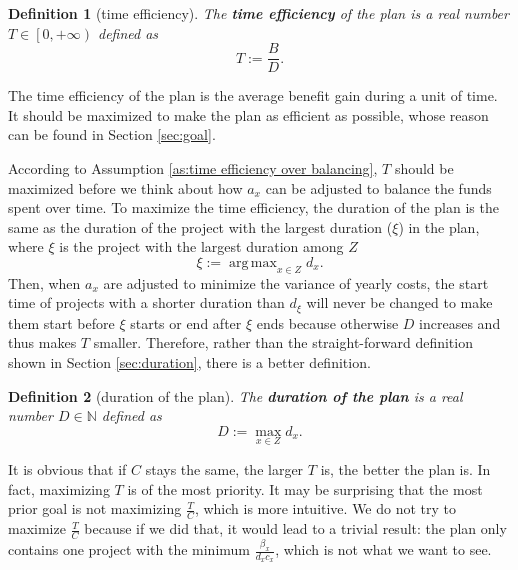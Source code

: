 \documentclass{article}
\DeclareMathOperator*{\argmax}{arg\,max}
\newtheorem{definition}{Definition}
\begin{document}
\begin{definition}[time efficiency]
The \textbf{time efficiency} of the plan is a real number $T\in\left[0,+\infty\right)$ defined as
\begin{equation}
T:=\frac BD.
\end{equation}
\end{definition}

The time efficiency of the plan is the average benefit gain during a unit of time.
It should be maximized to make the plan as efficient as possible,
whose reason can be found in Section \ref{sec:goal}.

According to Assumption \ref{as:time efficiency over balancing}, $T$ should be maximized before we think about how $a_x$ can be adjusted to balance the funds spent over time.
To maximize the time efficiency, the duration of the plan is the same as the duration of the project with the largest duration ($\xi$) in the plan,
where $\xi$ is the project with the largest duration among $Z$
\begin{equation}
\xi:=\argmax_{x\in Z}d_x.
\end{equation}
Then, when $a_x$ are adjusted to minimize the variance of yearly costs,
the start time of projects with a shorter duration than $d_\xi$ will never be changed to make them start before $\xi$ starts or end after $\xi$ ends
because otherwise $D$ increases and thus makes $T$ smaller.
Therefore, rather than the straight-forward definition shown in Section \ref{sec:duration}, there is a better definition.

\begin{definition}[duration of the plan]
The \textbf{duration of the plan} is a real number $D\in\mathbb N$ defined as
\begin{equation}
\label{eq:duration of the plan}
D:=\max_{x\in Z}d_x.
\end{equation}
\end{definition}

It is obvious that if $C$ stays the same, the larger $T$ is, the better the plan is.
In fact, maximizing $T$ is of the most priority.
It may be surprising that the most prior goal is not maximizing $\frac TC$, which is more intuitive.
We do not try to maximize $\frac TC$ because if we did that,
it would lead to a trivial result:
the plan only contains one project with the minimum $\frac{\beta_x}{d_xc_x}$, which is not what we want to see.
\end{document}
